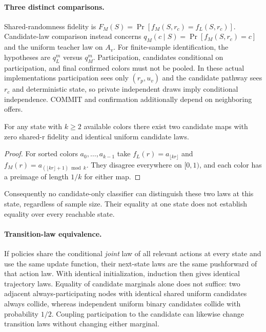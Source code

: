 \paragraph{Three distinct comparisons.}
Shared-randomness fidelity is
$F_M(S)=\Pr[f_M(S,r_c)=f_L(S,r_c)]$. Candidate-law comparison instead concerns
$q_M(c\mid S)=\Pr[f_M(S,r_c)=c]$ and the uniform teacher law on $A_v$.
For finite-sample identification, the hypotheses are $q_L^m$ versus $q_M^m$.
Participation, candidates conditional on participation, and final confirmed
colors must not be pooled. In these actual implementations participation sees
only $(r_p,u_v)$ and the candidate pathway sees $r_c$ and deterministic state,
so private independent draws imply conditional independence. COMMIT and
confirmation additionally depend on neighboring offers.

\begin{proposition}
For any state with $k\ge2$ available colors there exist two candidate maps
with zero shared-r fidelity and identical uniform candidate laws.
\end{proposition}
\begin{proof}
For sorted colors $a_0,\ldots,a_{k-1}$ take
$f_L(r)=a_{\lfloor kr\rfloor}$ and
$f_M(r)=a_{(\lfloor kr\rfloor+1)\bmod k}$. They disagree everywhere on $[0,1)$,
and each color has a preimage of length $1/k$ for either map.
\end{proof}
Consequently no candidate-only classifier can distinguish these two laws at
this state, regardless of sample size. Their equality at one state does not
establish equality over every reachable state.

\paragraph{Transition-law equivalence.}
If policies share the conditional \emph{joint} law of all relevant actions at
every state and use the same update function, their next-state laws are the
same pushforward of that action law. With identical initialization, induction
then gives identical trajectory laws. Equality of candidate marginals alone
does not suffice: two adjacent always-participating nodes with identical
shared uniform candidates always collide, whereas independent uniform binary
candidates collide with probability $1/2$. Coupling participation to the
candidate can likewise change transition laws without changing either marginal.

